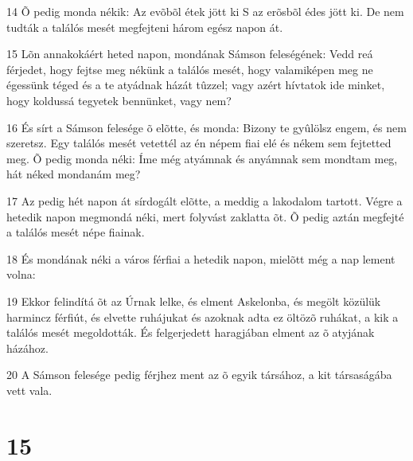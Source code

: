\par 14 Õ pedig monda nékik: Az evõbõl étek jött ki S az erõsbõl édes jött ki. De nem tudták a találós mesét megfejteni három egész napon át.
\par 15 Lõn annakokáért heted napon, mondának Sámson feleségének: Vedd reá férjedet, hogy fejtse meg nékünk a találós mesét, hogy valamiképen meg ne égessünk téged és a te atyádnak házát tûzzel; vagy azért hívtatok ide minket, hogy koldussá tegyetek bennünket, vagy nem?
\par 16 És sírt a Sámson felesége õ elõtte, és monda: Bizony te gyûlölsz engem, és nem szeretsz. Egy találós mesét vetettél az én népem fiai elé és nékem sem fejtetted meg. Õ pedig monda néki: Íme még atyámnak és anyámnak sem mondtam meg, hát néked mondanám meg?
\par 17 Az pedig hét napon át sírdogált elõtte, a meddig a lakodalom tartott. Végre a hetedik napon megmondá néki, mert folyvást zaklatta õt. Õ pedig aztán megfejté a találós mesét népe fiainak.
\par 18 És mondának néki a város férfiai a hetedik napon, mielõtt még a nap lement volna:
\par 19 Ekkor felindítá õt az Úrnak lelke, és elment Askelonba, és megölt közülük harmincz férfiút, és elvette ruhájukat és azoknak adta ez öltözõ ruhákat, a kik a találós mesét megoldották. És felgerjedett haragjában elment az õ atyjának házához.
\par 20 A Sámson felesége pedig férjhez ment az õ egyik társához, a kit társaságába vett vala.

\chapter{15}

